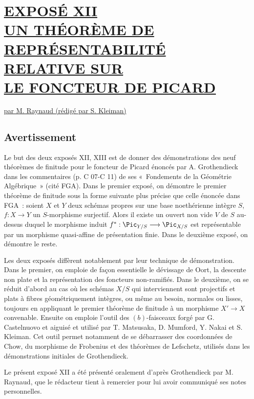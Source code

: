 \section*{\underline{EXPOSÉ XII}\\[3pt] \underline{\underline{UN THÉORÈME DE REPRÉSENTABILITÉ RELATIVE SUR}}\\[3pt] \underline{\underline{LE FONCTEUR DE PICARD}}}
\begin{center}
\underline{par M. Raynaud (rédigé par S. Kleiman)}
\end{center}

\subsection*{Avertissement}

Le but des deux exposés XII, XIII est de donner des démonstrations des neuf théorèmes de finitude pour le foncteur de Picard énoncés par A. Grothendieck dans les commentaires (p. C 07-C 11) de ses «~Fondements de la Géométrie Algébrique~» (cité FGA). Dans le premier exposé, on démontre le premier théorème de finitude sous la forme suivante plus précise que celle énoncée dans FGA~: soient \(X\) et \(Y\) deux schémas propres sur une base noethérienne intègre \(S\), \(f:X\longrightarrow Y\) un \(S\)-morphisme surjectif. Alors il existe un ouvert non vide \(V\) de \(S\) au-dessus duquel le morphisme induit \(f^*:\Pic_{Y/S}\longrightarrow \Pic_{X/S}\) est représentable par un morphisme quasi-affine de présentation finie. Dans le deuxième exposé, on démontre le reste.

Les deux exposés diffèrent notablement par leur technique de démonstration. Dans le premier, on emploie de façon essentielle le dévissage de Oort, la descente non plate et la représentation des foncteurs non-ramifiés. Dans le deuxième, on se réduit d'abord au cas où les schémas \(X/S\) qui interviennent sont projectifs et plats à fibres géométriquement intègres, ou même au besoin, normales ou lisses, toujours en appliquant le premier théorème de finitude à un morphisme \(X'\to X\) convenable. Ensuite on emploie l'outil des \((b)\)-faisceaux forgé par G. Castelnuovo et aiguisé et utilisé par T. Matsusaka, D. Mumford, Y. Nakai et S. Kleiman. Cet outil permet notamment de se débarrasser des coordonnées de Chow, du morphisme de Frobenius et des théorèmes de Lefschetz, utilisés dans les démonstrations initiales de Grothendieck.

Le présent exposé XII a été présenté oralement d'après Grothendieck par M. Raynaud, que le rédacteur tient à remercier pour lui avoir communiqué ses notes personnelles.

